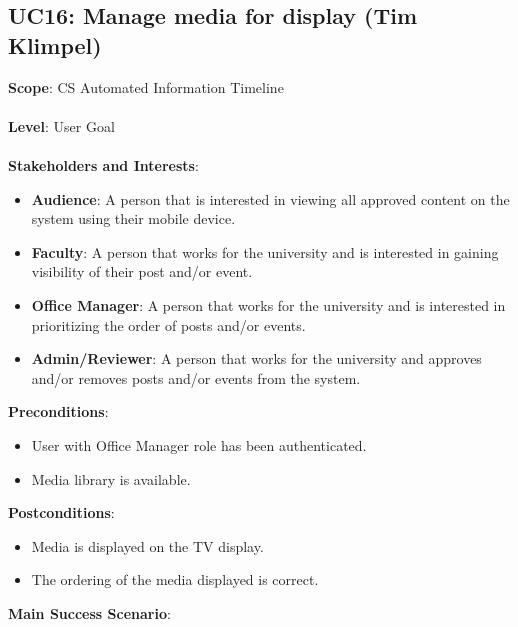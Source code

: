 \documentclass{article}
\begin{document}
\subsection{\textbf{UC16}: Manage media for display (Tim Klimpel)}
 \textbf{Scope}: CS Automated Information Timeline\\
     \\
        \textbf{Level}: User Goal\\
    \\
    \textbf{Stakeholders and Interests}:
    \begin{itemize}[label={}]
         \item \textbf{Audience}: A person that is interested in viewing all approved content on the system using their mobile device.
         \item \textbf{Faculty}: A person that works for the university and is interested in gaining visibility of their post and/or event.
         \item \textbf{Office Manager}: A person that works for the university and is interested in prioritizing the order of posts and/or events. 
          \item \textbf{Admin/Reviewer}: A person that works for the university and approves and/or removes posts and/or events from the system. 
    \end{itemize}
    \textbf{Preconditions}:
    \begin{itemize}[label={}]
        \item User with Office Manager role has been authenticated.
        \item Media library is available.
    \end{itemize}
    \textbf{Postconditions}:
        \begin{itemize}[label={}]
        \item Media is displayed on the TV display.
        \item The ordering of the media displayed is correct.
    \end{itemize}
    \textbf{Main Success Scenario}:
\end{document}
